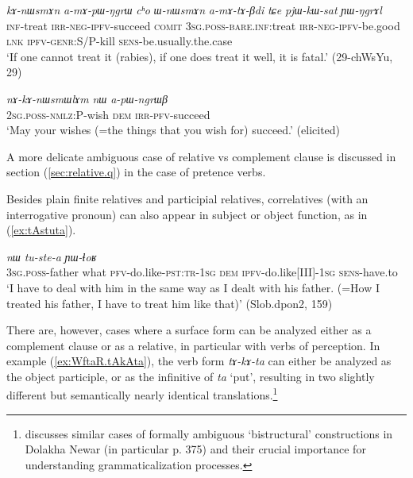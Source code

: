 \documentclass[oneside,a4paper,11pt]{article}
\newcommand{\ipa}[1]{\textit{\phon#1}}
\newcommand{\jpg}[2]{\ipa{#1} `#2'}
\begin{document}
\begin{exe}
\ex \label{ex:amApWNgrW}
\gll 
\ipa{kɤ-nɯsmɤn} 	\ipa{a-mɤ-pɯ-ŋgrɯ} 	\ipa{cʰo} 	\ipa{ɯ-nɯsmɤn} 	\ipa{a-mɤ-tɤ-βdi} 	\ipa{tɕe} 	\ipa{pjɯ-kɯ-sat} 	\ipa{ɲɯ-ŋgrɤl} \\
\textsc{inf}-treat \textsc{irr-neg-ipfv}-succeed \textsc{comit} \textsc{3sg.poss-bare.inf}:treat  \textsc{irr-neg-ipfv}-be.good \textsc{lnk} \textsc{ipfv-genr:S/P}-kill \textsc{sens}-be.usually.the.case \\
\glt `If one cannot treat it (rabies), if one does treat it well, it is fatal.' (29-chWsYu, 29)
\end{exe}

\begin{exe}
\ex \label{ex:nAkAnWsmWlAm}
\gll   \ipa{nɤ-kɤ-nɯsmɯlɤm} 	\ipa{nɯ} 	\ipa{a-pɯ-ngrɯβ} \\
\textsc{2sg.poss-nmlz:P}-wish \textsc{dem} \textsc{irr-pfv}-succeed \\
\glt `May your wishes (=the things that you wish for) succeed.' (elicited)
\end{exe}  

A more delicate ambiguous case of relative vs complement clause is discussed in section (\ref{sec:relative.q}) in the case of pretence verbs.

Besides plain finite relatives and participial relatives, correlatives (with an interrogative pronoun) can also appear in subject or object function, as in (\ref{ex:tAstuta}). 

\begin{exe}
\ex \label{ex:tAstuta}
\gll 
[\ipa{ɯ-wa} 	\ipa{tɕʰi} 	\ipa{tɤ-stu-t-a}] 	\ipa{nɯ} 	\ipa{tu-ste-a} 	\ipa{ɲɯ-ɬoʁ} \\
\textsc{3sg.poss-}father what \textsc{pfv}-do.like-\textsc{pst:tr}-\textsc{1sg} \textsc{dem} \textsc{ipfv}-do.like[III]-\textsc{1sg} \textsc{sens}-have.to \\
\glt `I have to deal with him in the same way as I dealt with his father. (=How I treated his father, I have to treat him like that)' (Slob.dpon2, 159)
\end{exe}

There are, however, cases where a surface form can be analyzed either as a complement clause or as a relative, in particular with verbs of perception. In example (\ref{ex:WftaR.tAkAta}), the verb form \ipa{tɤ-kɤ-ta} can either be analyzed as the object participle, or as the infinitive of \jpg{ta}{put}, resulting in two slightly different but semantically nearly identical translations.\footnote{\citet{genetti07grammar} discusses similar cases of formally ambiguous `bistructural' constructions in Dolakha Newar (in particular p. 375) and their crucial importance for understanding grammaticalization processes. }
\end{document}
